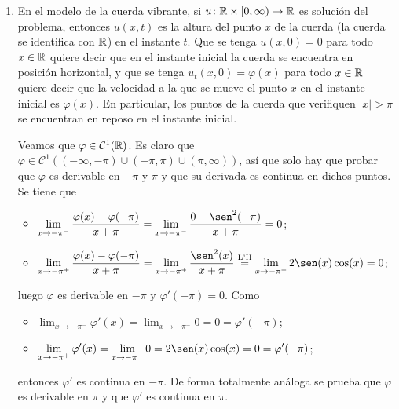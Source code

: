\documentclass[a4paper, 12pt, extrafontsizes]{memoir}
\begin{document}
\begin{solution}
\hfill
\begin{enumerate}
    \item En el modelo de la cuerda vibrante, si $u \colon \mathbb R \times[0,\infty) \to \mathbb R$ es solución del problema, entonces $u(x,t)$ es la altura del punto $x$ de la cuerda (la cuerda se identifica con $\mathbb R$) en el instante $t$. Que se tenga $u(x,0)=0$ para todo $x \in \mathbb R$ quiere decir que en el instante inicial la cuerda se encuentra en posición horizontal, y que se tenga $u_t(x,0) = \varphi(x)$ para todo $x \in \mathbb R$ quiere decir que la velocidad a la que se mueve el punto $x$ en el instante inicial es $\varphi(x)$. En particular, los puntos de la cuerda que verifiquen $|x| > \pi$ se encuentran en reposo en el instante inicial. 
    
    Veamos que $\varphi \in \mathcal{C}^1(\mathbb R)$. Es claro que $\varphi \in \mathcal{C}^1((-\infty,-\pi) \cup (-\pi,\pi) \cup (\pi,\infty))$, así que solo hay que probar que $\varphi$ es derivable en $-\pi$ y $\pi$ y que su derivada es continua en dichos puntos. Se tiene que
    \begin{itemize}
        \item $\displaystyle\lim_{x \to {-\pi^-}} \frac{\varphi(x)-\varphi(-\pi)}{x+\pi} = \displaystyle\lim_{x \to {-\pi^-}} \frac{0-\sen^2(-\pi)}{x+\pi}  = 0$;
        \item $\displaystyle\lim_{x \to {-\pi^+}} \frac{\varphi(x)-\varphi(-\pi)}{x+\pi} = \displaystyle\lim_{x \to {-\pi^+}} \frac{\sen^2(x)}{x+\pi} \overset{\textup{L'H}}{=} \lim_{x \to {-\pi^+}} 2\sen(x)\cos(x) = 0$;
    \end{itemize}
    luego $\varphi$ es derivable en $-\pi$ y $\varphi'(-\pi) = 0$. Como
    \begin{itemize}
        \item $\displaystyle\lim_{x \to -\pi^-}\varphi'(x) = \lim_{x \to -\pi^-}0 = 0 = \varphi'(-\pi)$;
        \item $\displaystyle\lim_{x \to -\pi^+}\varphi'(x) = \lim_{x \to -\pi^-}0 = 2\sen(x)\cos(x) = 0 = \varphi'(-\pi)$;
    \end{itemize}
    entonces $\varphi'$ es continua en $-\pi$. De forma totalmente análoga se prueba que $\varphi$ es derivable en $\pi$ y que $\varphi'$ es continua en $\pi$.


\end{enumerate}
\end{solution}
\end{document}
